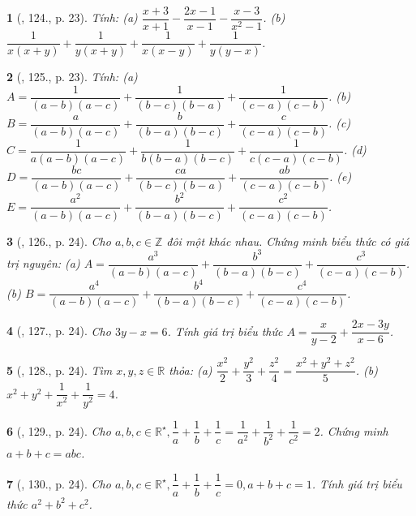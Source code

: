 \documentclass{article}
\newtheorem{baitoan}{}
\begin{document}
\begin{baitoan}[\cite{Binh_Toan_8_tap_1}, 124., p. 23]
	Tính: (a) $\dfrac{x + 3}{x + 1} - \dfrac{2x - 1}{x - 1} - \dfrac{x - 3}{x^2 - 1}$. (b) $\dfrac{1}{x(x + y)} + \dfrac{1}{y(x + y)} + \dfrac{1}{x(x - y)} + \dfrac{1}{y(y - x)}$.
\end{baitoan}

\begin{baitoan}[\cite{Binh_Toan_8_tap_1}, 125., p. 23]
	Tính: (a) $A = \dfrac{1}{(a - b)(a - c)} + \dfrac{1}{(b - c)(b - a)} + \dfrac{1}{(c - a)(c - b)}$. (b) $B = \dfrac{a}{(a - b)(a - c)} + \dfrac{b}{(b - a)(b - c)} + \dfrac{c}{(c - a)(c - b)}$. (c) $C = \dfrac{1}{a(a - b)(a - c)} + \dfrac{1}{b(b - a)(b - c)} + \dfrac{1}{c(c - a)(c - b)}$. (d) $D = \dfrac{bc}{(a - b)(a - c)} + \dfrac{ca}{(b - c)(b - a)} + \dfrac{ab}{(c - a)(c - b)}$. (e) $E = \dfrac{a^2}{(a - b)(a - c)} + \dfrac{b^2}{(b - a)(b - c)} + \dfrac{c^2}{(c - a)(c - b)}$.
\end{baitoan}

\begin{baitoan}[\cite{Binh_Toan_8_tap_1}, 126., p. 24]
	Cho $a,b,c\in\mathbb{Z}$ đôi một khác nhau. Chứng minh biểu thức có giá trị nguyên: (a) $A = \dfrac{a^3}{(a - b)(a - c)} + \dfrac{b^3}{(b - a)(b - c)} + \dfrac{c^3}{(c - a)(c - b)}$. (b) $B = \dfrac{a^4}{(a - b)(a - c)} + \dfrac{b^4}{(b - a)(b - c)} + \dfrac{c^4}{(c - a)(c - b)}$.
\end{baitoan}

\begin{baitoan}[\cite{Binh_Toan_8_tap_1}, 127., p. 24]
	Cho $3y - x = 6$. Tính giá trị biểu thức $A = \dfrac{x}{y - 2} + \dfrac{2x - 3y}{x - 6}$.
\end{baitoan}

\begin{baitoan}[\cite{Binh_Toan_8_tap_1}, 128., p. 24]
	Tìm $x,y,z\in\mathbb{R}$ thỏa: (a) $\dfrac{x^2}{2} + \dfrac{y^2}{3} + \dfrac{z^2}{4} = \dfrac{x^2 + y^2 + z^2}{5}$. (b) $x^2 + y^2 + \dfrac{1}{x^2} + \dfrac{1}{y^2} = 4$.
\end{baitoan}

\begin{baitoan}[\cite{Binh_Toan_8_tap_1}, 129., p. 24]
	Cho $a,b,c\in\mathbb{R}^\star,\dfrac{1}{a} + \dfrac{1}{b} + \dfrac{1}{c} = \dfrac{1}{a^2} + \dfrac{1}{b^2} + \dfrac{1}{c^2} = 2$. Chứng minh $a + b + c = abc$.
\end{baitoan}

\begin{baitoan}[\cite{Binh_Toan_8_tap_1}, 130., p. 24]
	Cho $a,b,c\in\mathbb{R}^\star,\dfrac{1}{a} + \dfrac{1}{b} + \dfrac{1}{c} = 0,a + b + c = 1$. Tính giá trị biểu thức $a^2 + b^2 + c^2$.
\end{baitoan}
\end{document}
